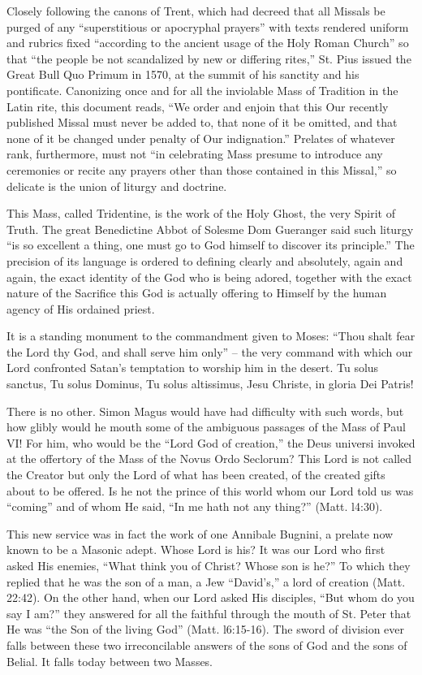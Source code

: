 Closely following the canons of Trent, which had decreed that all Missals be purged of any ``superstitious or apocryphal prayers'' with texts rendered uniform and rubrics fixed ``according to the ancient usage of the Holy Roman Church'' so that ``the people be not scandalized by new or differing rites,'' St. Pius issued the Great Bull Quo Primum in 1570, at the summit of his sanctity and his pontificate. Canonizing once and for all the inviolable Mass of Tradition in the Latin rite, this document reads, ``We order and enjoin that this Our recently published Missal must never be added to, that none of it be omitted, and that none of it be changed under penalty of Our indignation.'' Prelates of whatever rank, furthermore, must not ``in celebrating Mass presume to introduce any ceremonies or recite any prayers other than those contained in this Missal,'' so delicate is the union of liturgy and doctrine.

This Mass, called Tridentine, is the work of the Holy Ghost, the very Spirit of Truth. The great Benedictine Abbot of Solesme Dom Gueranger said such liturgy ``is so excellent a thing, one must go to God himself to discover its principle.'' The precision of its language is ordered to defining clearly and absolutely, again and again, the exact identity of the God who is being adored, together with the exact nature of the Sacrifice this God is actually offering to Himself by the human agency of His ordained priest.

It is a standing monument to the commandment given to Moses: ``Thou shalt fear the Lord thy God, and shall serve him only'' -- the very command with which our Lord confronted Satan's temptation to worship him in the desert. Tu solus sanctus, Tu solus Dominus, Tu solus altissimus, Jesu Christe, in gloria Dei Patris!

There is no other. Simon Magus would have had difficulty with such words, but how glibly would he mouth some of the ambiguous passages of the Mass of Paul VI! For him, who would be the ``Lord God of creation,'' the Deus universi invoked at the offertory of the Mass of the Novus Ordo Seclorum? This Lord is not called the Creator but only the Lord of what has been created, of the created gifts about to be offered. Is he not the prince of this world whom our Lord told us was ``coming'' and of whom He said, ``In me hath not any thing?'' (Matt. l4:30).

This new service was in fact the work of one Annibale Bugnini, a prelate now known to be a Masonic adept. Whose Lord is his? It was our Lord who first asked His enemies, ``What think you of Christ? Whose son is he?'' To which they replied that he was the son of a man, a Jew ``David's,'' a lord of creation (Matt. 22:42). On the other hand, when our Lord asked His disciples, ``But whom do you say I am?'' they answered for all the faithful through the mouth of St. Peter that He was ``the Son of the living God'' (Matt. l6:15-16). The sword of division ever falls between these two irreconcilable answers of the sons of God and the sons of Belial. It falls today between two Masses.

